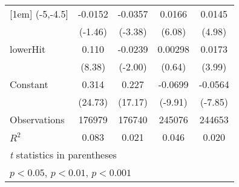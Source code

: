 {\begin{tabular}{l*{4}{c}}
[1em]
(-5,-4.5]           &     -0.0152         &     -0.0357\sym{***}&      0.0166\sym{***}&      0.0145\sym{***}\\
                    &     (-1.46)         &     (-3.38)         &      (6.08)         &      (4.98)         \\
[1em]
lowerHit            &       0.110\sym{***}&     -0.0239\sym{*}  &     0.00298         &      0.0173\sym{***}\\
                    &      (8.38)         &     (-2.00)         &      (0.64)         &      (3.99)         \\
[1em]
Constant            &       0.314\sym{***}&       0.227\sym{***}&     -0.0699\sym{***}&     -0.0564\sym{***}\\
                    &     (24.73)         &     (17.17)         &     (-9.91)         &     (-7.85)         \\
\hline
Observations        &      176979         &      176740         &      245076         &      244653         \\
\(R^{2}\)           &       0.083         &       0.021         &       0.046         &       0.020         \\
\hline\hline
\multicolumn{5}{l}{\footnotesize \textit{t} statistics in parentheses}\\
\multicolumn{5}{l}{\footnotesize \sym{*} \(p<0.05\), \sym{**} \(p<0.01\), \sym{***} \(p<0.001\)}\\
\end{tabular}
}
